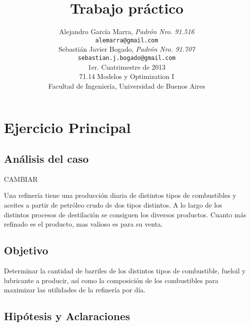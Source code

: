\documentclass[a4paper,10pt]{article}
\title{		\textbf{Trabajo pr\'actico}}
\author{	Alejandro Garc\'ia Marra, \textit{Padr\'on Nro. 91.516}                     \\
            \texttt{ alemarra@gmail.com }                                              \\
            Sebasti\'an Javier Bogado, \textit{Padr\'on Nro. 91.707}                     \\
            \texttt{ sebastian.j.bogado@gmail.com }                                              \\
            \normalsize{1er. Cuatrimestre de 2013}                       \\
            \normalsize{71.14 Modelos y Optimization I}                             \\
            \normalsize{Facultad de Ingenier\'ia, Universidad de Buenos Aires}            \\
       }
\date{}
\begin{document}
\maketitle

\thispagestyle{empty}


\newpage
\section{Ejercicio Principal}

\subsection{An\'alisis del caso}

CAMBIAR

Una refiner\'ia tiene una producci\'on diaria de distintos tipos de combustibles y aceites a partir de petr\'oleo crudo de dos tipos distintos. A lo largo de los distintos procesos de destilaci\'on se consiguen los diversos productos. Cuanto m\'as refinado es el producto, mas valioso es para su venta.

\subsection{Objetivo}
Determinar la cantidad de barriles de los distintos tipos de combustible, fueloil y lubricante a producir, as\'i como la composici\'on de los combustibles para maximizar las utilidades de la refiner\'ia por d\'ia.
\vspace{10mm}

\subsection{Hip\'otesis y Aclaraciones}
\end{document}

